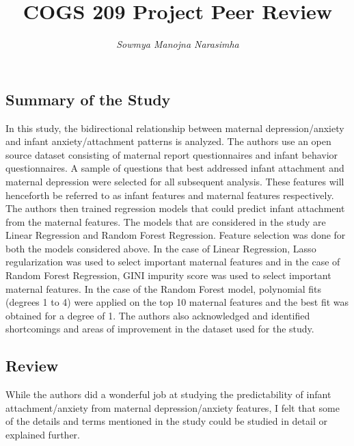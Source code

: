 \documentclass{article}
\title{\vspace{-4em}COGS 209 Project Peer Review}
\author{\textit{\vspace{-2em}Sowmya Manojna Narasimha}}
\date{}
\begin{document}
\maketitle

\subsection*{Summary of the Study}
In this study, the bidirectional relationship between maternal depression/anxiety and infant anxiety/attachment patterns is analyzed. The authors use an open source dataset consisting of maternal report questionnaires and infant behavior questionnaires. A sample of questions that best addressed infant attachment and maternal depression were selected for all subsequent analysis. These features will henceforth be referred to as infant features and maternal features respectively.\\

\noindent
The authors then trained regression models that could predict infant attachment from the maternal features. The models that are considered in the study are Linear Regression and Random Forest Regression. Feature selection was done for both the models considered above. In the case of Linear Regression, Lasso regularization was used to select important maternal features and in the case of Random Forest Regression, GINI impurity score was used to select important maternal features. In the case of the Random Forest model, polynomial fits (degrees 1 to 4) were applied on the top 10 maternal features and the best fit was obtained for a degree of 1. The authors also acknowledged and identified shortcomings and areas of improvement in the dataset used for the study.


\subsection*{Review}
While the authors did a wonderful job at studying the predictability of infant attachment/anxiety from maternal depression/anxiety features, I felt that some of the details and terms mentioned in the study could be studied in detail or explained further.\\
\end{document}
